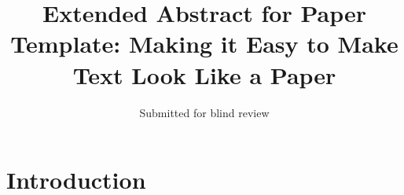 \documentclass[sigconf]{acmart}
\begin{document}
\title{Extended Abstract for Paper Template: Making it Easy to Make Text Look Like a Paper}

\author{Submitted for blind review}
\date{}

\maketitle

\section{Introduction}
\end{document}
